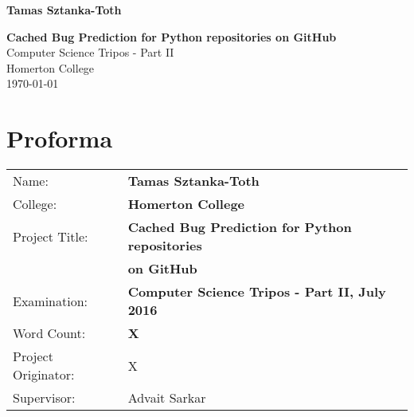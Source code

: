 \documentclass[12pt,twoside,notitlepage]{report}
\begin{document}





\pagestyle{empty}

\hfill{\LARGE \bf Tamas Sztanka-Toth}

\vspace*{60mm}
\begin{center}
\Huge
{\bf Cached Bug Prediction for Python repositories on GitHub} \\
\vspace*{5mm}
Computer Science Tripos - Part II \\
\vspace*{5mm}
Homerton College \\
\vspace*{5mm}
\today  %
\end{center}

\cleardoublepage


\setcounter{page}{1}
\pagestyle{plain}

\chapter*{Proforma}

{\large
\begin{tabular}{ll}
Name:               & \bf Tamas Sztanka-Toth                       \\
College:            & \bf Homerton College                     \\
Project Title:      & \bf Cached Bug Prediction for Python repositories\\ 						& \bf on GitHub \\
Examination:        & \bf Computer Science Tripos - Part II, July 2016        \\
Word Count:         & \bf X\footnotemark[1]				 \\
Project Originator: & X                   \\
Supervisor:         & Advait Sarkar                    \\ 
\end{tabular}
}
\end{document}

